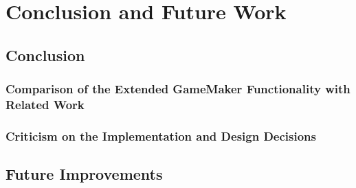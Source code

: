 \documentclass[bsc,frontabs,twoside,singlespacing,parskip,deptreport]{infthesis}     %
\begin{document}
\chapter{Conclusion and Future Work}
\section{Conclusion}
\subsection{Comparison of the Extended GameMaker Functionality with Related Work}
\subsection{Criticism on the Implementation and Design Decisions}

\section{Future Improvements}








\end{document}
